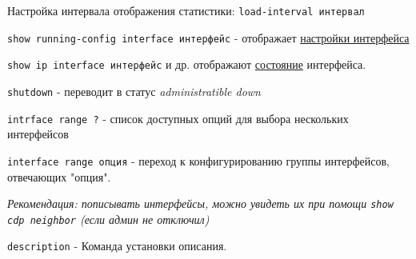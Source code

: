 \documentclass[a4paper,12pt]{article}
\begin{document}
	Настройка интервала отображения статистики: \texttt{load-interval интервал}
	
	\texttt{show running-config interface интерфейс} - отображает \underline{настройки интерфейса}
	
	\texttt{show ip interface интерфейс} и др. отображают \underline{состояние} интерфейса.
	
	\texttt{shutdown} - переводит в статус \emph{administratible down}
	
	\texttt{intrface range ?} - список доступных опций для выбора нескольких интерфейсов
	
	\texttt{interface range опция} - переход к конфигурированию группы интерфейсов, отвечающих "опция".
	
	\textit{Рекомендация: пописывать интерфейсы, можно увидеть их при помощи \texttt{show cdp neighbor} (если админ не отключил)}
	
	\texttt{description} - Команда установки описания.
 
\end{document}
